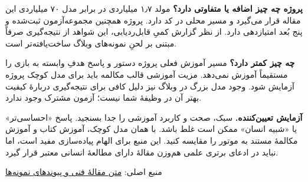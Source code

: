 \documentclass[a4paper,12pt]{article}
\newcommand{\en}[1]{\lr{#1}}
\newcommand{\source}[2]{\par\small منبع اصلی: \href{#1}{#2}\par\normalsize}
\begin{document}
\textbf{پروژه چه چیز اضافه یا متفاوتی دارد؟} مولد ۱٫۷ میلیاردی در برابر مدل ۷۰ میلیاردی این مقاله قرار می‌گیرد و مسیر \en{GGUF} محلی در کد دارد. پروژه همچنین مجموعه‌آزمون ثبت‌شده و پنج بُعد امتیازدهی دارد. از نظر گزارش کمیِ قابل‌ردیابی، این شواهد از نتیجه‌گیری صرفاً مبتنی بر لحنِ نمونه‌های وبلاگ ساخت‌یافته‌تر است.

\textbf{چه چیز کمتر دارد؟} مسیر آموزش فعلی پروژه دستور و پاسخ هدفِ وابسته به بازی را مستقیماً آموزش نمی‌دهد. مزیت آموزشی قالب مکالمه باید برای مدل کوچک پروژه آزمایش شود. وجود مدل بزرگ در وبلاگ نیز دلیل کافی برای نتیجه‌گیری دربارهٔ کیفیت بهتر آن در وظیفهٔ شما نیست؛ آزمون مشترک وجود ندارد.

\textbf{آزمایش تعیین‌کننده.} سبک، صحت و کاربرد آموزشی را جدا بسنجید. پاسخ «احساسی‌تر» یا «شبیه انسان» ممکن است غلط باشد. با همان مدل کوچک، آموزش کتاب و آموزش مکالمهٔ مستند به موتور را مقایسه کنید. این منبع برای الهام پیاده‌سازی مفید است، اما نباید در ادعای برتری علمی هم‌وزن مقالهٔ دارای مطالعهٔ انسانی معتبر قرار گیرد.
\source{https://www.tredence.com/blog/finetuning-a-chess-commentary-model}{متن مقالهٔ فنی و پیوندهای نمونه‌ها}

\clearpage
\end{document}

